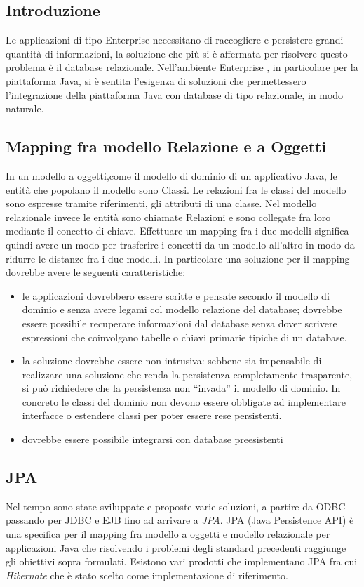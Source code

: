 \subsection{Introduzione}
Le applicazioni di tipo Enterprise necessitano di raccogliere e persistere grandi quantità di informazioni, la soluzione che più si è affermata per risolvere questo problema è il database relazionale. Nell'ambiente Enterprise
, in particolare per la piattaforma Java, si è sentita l'esigenza di soluzioni che permettessero l'integrazione della piattaforma Java con database di tipo relazionale, in modo naturale. 

\subsection{Mapping fra modello Relazione e a Oggetti}
In un modello a oggetti,come il modello di dominio di un applicativo Java, le entità che popolano il modello sono Classi. Le relazioni fra le classi del modello sono espresse tramite riferimenti, gli attributi di una classe.
Nel modello relazionale invece le entità sono chiamate Relazioni e sono collegate fra loro mediante il concetto di chiave. Effettuare un mapping fra i due modelli significa quindi avere un modo per trasferire i concetti da un modello
all'altro in modo da ridurre le distanze fra i due modelli. In particolare una soluzione per il mapping dovrebbe avere le seguenti caratteristiche:

\begin{itemize}
 \item le applicazioni dovrebbero essere scritte e pensate secondo il modello di dominio e senza avere legami col modello relazione del database; dovrebbe essere possibile recuperare informazioni dal database senza dover scrivere espressioni
 che coinvolgano tabelle o chiavi primarie tipiche di un database.
 \item la soluzione dovrebbe essere non intrusiva: sebbene sia impensabile di realizzare una soluzione che renda la persistenza completamente trasparente, si può richiedere che la persistenza non ``invada'' il modello di dominio.
  In concreto le classi del dominio non devono essere obbligate ad implementare interfacce o estendere classi per poter essere rese persistenti.
  \item dovrebbe essere possibile integrarsi con database preesistenti
\end{itemize}


\subsection{JPA}
Nel tempo sono state sviluppate e proposte varie soluzioni, a partire da ODBC passando per JDBC e EJB fino ad arrivare a \textsl{JPA}.
JPA (Java Persistence API) è una specifica per il mapping fra modello a oggetti e modello relazionale per applicazioni Java che risolvendo i problemi degli standard precedenti raggiunge
gli obiettivi sopra formulati. Esistono vari prodotti che implementano JPA fra cui \textsl{Hibernate} che è stato scelto come
implementazione di riferimento.

